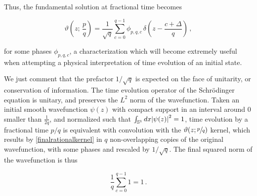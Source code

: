 \documentclass{article}
\newcommand{\cmnt}[1]{\textcolor{red}{\emph{#1}}}
\begin{document}
%
%


Thus, the fundamental solution at fractional time becomes

\begin{equation}\label{finalrationalkernel}
    \vartheta\left( z ; \,\frac{p}{q} \right) = \frac{1}{\sqrt{q}} \sum_{c=0}^{q-1} \phi_{p,q,c} \, \delta \left(z-\frac{c+\Delta}{q}\right)\,,
\end{equation}

for some phases $\phi_{p,q,c}$, a characterization which will become extremely useful when attempting a physical interpretation of time evolution of an initial state.

We just comment that the prefactor $1/\sqrt{q}$ is expected on the face of unitarity, or conservation of information. The time evolution operator of the Schr\"odinger equation is unitary, and preserves the $L^2$ norm of the wavefunction. Taken an initial smooth wavefunction $\psi(z)$ with compact support in an interval around $0$ smaller than $\frac{1}{2q}$, and normalized such that $\int_{\mathbb{S}^1} dx \abs{\psi(z)}^2 = 1$, time evolution by a fractional time $p/q$ is equivalent with convolution with the $\vartheta(z;\sfrac{p}{q})$ kernel, which results by \eqref{finalrationalkernel} in $q$ non-overlapping copies of the original wavefunction, with some phases and rescaled by $1/\sqrt{q}$. The final squared norm of the wavefunction is thus

\begin{equation}
    \frac{1}{q}\sum_{c=0}^{q-1} 1 = 1\,.
\end{equation}
\end{document}
